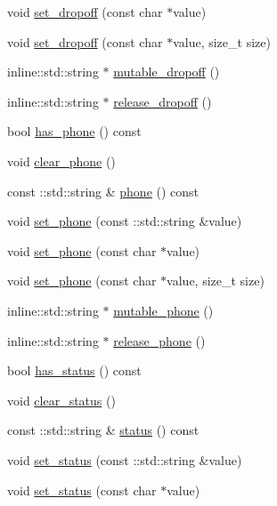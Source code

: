 \begin{DoxyCompactItemize}
\item 
void \hyperlink{classPatronInfo_ab51fde282abba10493b5fc4fc9ddf29f}{set\-\_\-dropoff} (const char $\ast$value)
\item 
void \hyperlink{classPatronInfo_ac3ea8bbb5b8865efb242f332de8439aa}{set\-\_\-dropoff} (const char $\ast$value, size\-\_\-t size)
\item 
inline\-::std\-::string $\ast$ \hyperlink{classPatronInfo_a72174e049d35af15202c52139b45f62b}{mutable\-\_\-dropoff} ()
\item 
inline\-::std\-::string $\ast$ \hyperlink{classPatronInfo_a0a456da593ac3a01c4202fe08c040110}{release\-\_\-dropoff} ()
\item 
bool \hyperlink{classPatronInfo_a96d960676d7abfbdfd2d37804474550b}{has\-\_\-phone} () const 
\item 
void \hyperlink{classPatronInfo_a326a539882a078db8064e113ad98b920}{clear\-\_\-phone} ()
\item 
const \-::std\-::string \& \hyperlink{classPatronInfo_a15ce60dbafa30f6c63faf467a3c857d2}{phone} () const 
\item 
void \hyperlink{classPatronInfo_a03497ca00dd2e71007b7b8359870b8ec}{set\-\_\-phone} (const \-::std\-::string \&value)
\item 
void \hyperlink{classPatronInfo_a2c65442490e531178c76b2be787813fe}{set\-\_\-phone} (const char $\ast$value)
\item 
void \hyperlink{classPatronInfo_a35be1972326c8e851930d5bb759cdf5f}{set\-\_\-phone} (const char $\ast$value, size\-\_\-t size)
\item 
inline\-::std\-::string $\ast$ \hyperlink{classPatronInfo_ac52e50dc71465b41d2c99c720676e470}{mutable\-\_\-phone} ()
\item 
inline\-::std\-::string $\ast$ \hyperlink{classPatronInfo_a652deb674f0370f1100d7f467975f5dc}{release\-\_\-phone} ()
\item 
bool \hyperlink{classPatronInfo_a6fe385e7af87310fa75570cca1baddf8}{has\-\_\-status} () const 
\item 
void \hyperlink{classPatronInfo_a6940c0707814aec4303b86549338412c}{clear\-\_\-status} ()
\item 
const \-::std\-::string \& \hyperlink{classPatronInfo_a4c023499f0a1136fbd75b0313d2848da}{status} () const 
\item 
void \hyperlink{classPatronInfo_a159e02363fd36d5b846bf84e9dfe0855}{set\-\_\-status} (const \-::std\-::string \&value)
\item 
void \hyperlink{classPatronInfo_ac3ca3ec0d33bd61cf7effd8879895051}{set\-\_\-status} (const char $\ast$value)

\end{DoxyCompactItemize}
